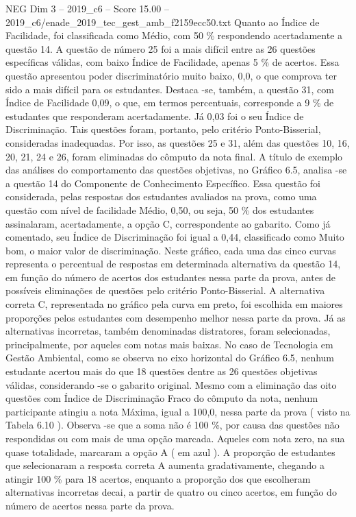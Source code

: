 \begin{textsample}{NEG Dim 3 – 2019\_c6 – Score 15.00 – 2019\_c6/enade\_2019\_tec\_gest\_amb\_f2159ecc50.txt}
Quanto ao Índice de Facilidade, foi classificada como Médio, com 50 \% respondendo acertadamente a questão 14.
A questão de número 25 foi a mais difícil entre as 26 questões específicas válidas, com baixo Índice de Facilidade, apenas 5 \% de acertos.
Essa questão apresentou poder discriminatório muito baixo, 0,0, o que comprova ter sido a mais difícil para os estudantes.
Destaca -se, também, a questão 31, com Índice de Facilidade 0,09, o que, em termos percentuais, corresponde a 9 \% de estudantes que responderam acertadamente.
Já 0,03 foi o seu Índice de Discriminação.
Tais questões foram, portanto, pelo critério Ponto-Bisserial, consideradas inadequadas.
Por isso, as questões 25 e 31, além das questões 10, 16, 20, 21, 24 e 26, foram eliminadas do cômputo da nota final.
A título de exemplo das análises do comportamento das questões objetivas, no Gráfico 6.5, analisa -se a questão 14 do Componente de Conhecimento Específico.
Essa questão foi considerada, pelas respostas dos estudantes avaliados na prova, como uma questão com nível de facilidade Médio, 0,50, ou seja, 50 \% dos estudantes assinalaram, acertadamente, a opção C, correspondente ao gabarito.
Como já comentado, seu Índice de Discriminação foi igual a 0,44, classificado como Muito bom, o maior valor de discriminação.
Neste gráfico, cada uma das cinco curvas representa o percentual de respostas em determinada alternativa da questão 14, em função do número de acertos dos estudantes nessa parte da prova, antes de possíveis eliminações de questões pelo critério Ponto-Bisserial.
A alternativa correta C, representada no gráfico pela curva em preto, foi escolhida em maiores proporções pelos estudantes com desempenho melhor nessa parte da prova.
Já as alternativas incorretas, também denominadas distratores, foram selecionadas, principalmente, por aqueles com notas mais baixas.
No caso de Tecnologia em Gestão Ambiental, como se observa no eixo horizontal do Gráfico 6.5, nenhum estudante acertou mais do que 18 questões dentre as 26 questões objetivas válidas, considerando -se o gabarito original.
Mesmo com a eliminação das oito questões com Índice de Discriminação Fraco do cômputo da nota, nenhum participante atingiu a nota Máxima, igual a 100,0, nessa parte da prova ( visto na Tabela 6.10 ).
Observa -se que a soma não é 100 \%, por causa das questões não respondidas ou com mais de uma opção marcada.
Aqueles com nota zero, na sua quase totalidade, marcaram a opção A ( em azul ).
A proporção de estudantes que selecionaram a resposta correta A aumenta gradativamente, chegando a atingir 100 \% para 18 acertos, enquanto a proporção dos que escolheram alternativas incorretas decai, a partir de quatro ou cinco acertos, em função do número de acertos nessa parte da prova.

\end{textsample}
